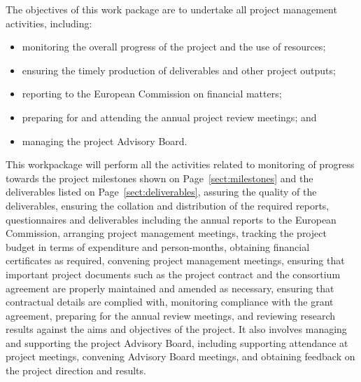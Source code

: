 \begin{workpackage}[id=management,type=MGT,wphases=0-48!.2,
  title=Project Management,short=Management,
  PSRM=48,SARM=48]

\begin{wpobjectives}
  The objectives of this work package are to undertake all project management activities,
  including:
  \begin{itemize}
  \item monitoring the overall progress of the project and the use of
    resources;
  \item ensuring the timely production of deliverables and other
    project outputs;
  \item reporting to the European Commission on financial matters;
  \item preparing for and attending the annual project review
    meetings; and
  \item managing the project Advisory Board.
  \end{itemize}

\end{wpobjectives}

\begin{wpdescription}
  This workpackage will perform all the activities related to
  monitoring of progress towards the project milestones shown on
  Page~\ref{sect:milestones} and the deliverables listed on
  Page~\ref{sect:deliverables}, assuring the quality of the
  deliverables, ensuring the collation and distribution of the
  required reports, questionnaires and deliverables including the
  annual reports to the European Commission, arranging project
  management meetings, tracking the project budget in terms of
  expenditure and person-months, obtaining financial certificates as
  required, convening project management meetings, ensuring that
  important project documents such as the project contract and the
  consortium agreement are properly maintained and amended as
  necessary, ensuring that contractual details are complied with,
  monitoring compliance with the grant agreement, preparing for the
  annual review meetings, and reviewing research results against the
  aims and objectives of the project. It also involves managing and
  supporting the project Advisory Board, including supporting
  attendance at project meetings, convening Advisory Board meetings,
  and obtaining feedback on the project direction and results.
\end{wpdescription}


\end{workpackage}

